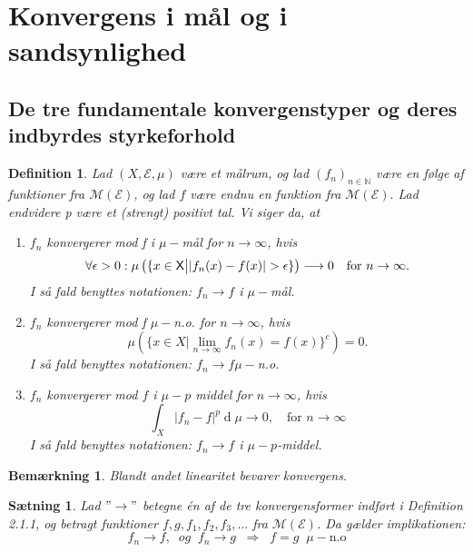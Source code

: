 \documentclass{article}
\newcommand{\N}{\mathbb{N}}
\newcommand{\1}{\mathbbm{1}}
\newcommand{\X}{\mathsf{X}}
\newcommand{\deriv}{\operatorname{d}}
\theoremstyle{boxed}
\newtheorem{definition}[theorem]{Definition}
\newtheorem{remark}[theorem]{Bemærkning}
\newtheorem{proposition}[theorem]{Sætning}
\begin{document}
\section{Konvergens i mål og i sandsynlighed}
\subsection{De tre fundamentale konvergenstyper og deres indbyrdes styrkeforhold}
\begin{theorem-box}
    \begin{definition}
        Lad $(X,\mathcal{E}, \mu)$ være et målrum, og lad $(f_n)_{n\in\N}$ være en følge af funktioner fra $\mathcal{M}(\mathcal{E})$, og lad $f$ være endnu en funktion fra $\mathcal{M}(\mathcal{E}).$ Lad endvidere p være et (strengt) positivt tal. Vi siger da, at 
        \begin{enumerate}
            \item[\textnormal{(a)}] $f_n$ konvergerer mod f i $\mu-$mål for $n\rightarrow \infty$, hvis $$\forall\epsilon>0:\mu\left(\{x\in\X\big{|}|f_n(x)-f(x)|>\epsilon\}\right)\longrightarrow 0 \quad \text{for }n\rightarrow \infty.$$
            I så fald benyttes notationen: $f_n\rightarrow f$ i $\mu-$mål.
            \item[\textnormal{(b)}] $f_n$ konvergerer mod f $\mu-$n.o. for $n\rightarrow\infty$, hvis $$\mu\left(\{x\in X|\lim_{n\rightarrow \infty}f_n(x)=f(x)\}^c\right)=0.$$
            I så fald benyttes notationen: $f_n\rightarrow f \mu-$n.o.
            \item[\textnormal{(c)}] $f_n$ konvergerer mod $f$ i $\mu-p$ middel for $n\rightarrow \infty$, hvis 
            $$\int_X|f_n-f|^p\deriv\mu\longrightarrow 0, \quad \text{for }n\rightarrow \infty$$
            I så fald benyttes notationen: $f_n\rightarrow f$ i $\mu-p$-middel.
        \end{enumerate}
    \end{definition}
\end{theorem-box}
\begin{remark}
    Blandt andet linearitet bevarer konvergens.
\end{remark}
\begin{theorem-box}
    \begin{proposition}
        Lad $"\rightarrow"$ betegne én af de tre konvergensformer indført i Definition 2.1.1, og betragt funktioner $f,g,f_1,f_2,f_3,\dots$ fra $\mathcal{M}(\mathcal{E})$. Da gælder implikationen:
        $$f_n\longrightarrow f, \;\; og \;\; f_n\longrightarrow g \;\;\Longrightarrow\;\;f=g\;\; \mu-\text{n.o}$$
    \end{proposition}
\end{theorem-box}
\end{document}

